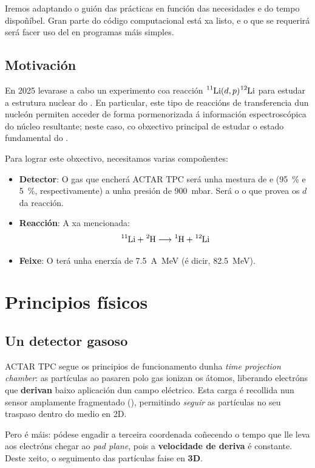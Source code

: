 \documentclass[11pt, a4paper]{article}
\newcommand{\iso}[2]{\ce{^{#1}#2}}
\begin{document}
Iremos adaptando o guión das prácticas en función das necesidades e do tempo dispoñíbel. Gran parte do código computacional está xa listo, e o que se requerirá será facer uso del en programas máis simples.

\subsection{Motivación}
En 2025 levarase a cabo un experimento coa reacción $\iso{11}{Li}(d, p)\iso{12}{Li}$ para estudar a estrutura nuclear do \iso{12}{Li}. En particular, este tipo de reaccións de transferencia dun nucleón permiten acceder de forma pormenorizada á información espectroscópica do núcleo resultante; neste caso, co obxectivo principal de estudar o estado fundamental do \iso{12}{Li}.

Para lograr este obxectivo, necesitamos varias compoñentes:
\begin{itemize}
    \item \textbf{Detector}: O gas que encherá ACTAR TPC será unha mestura de  e  (\qty{95}{\percent} e \qty{5}{\percent}, respectivamente) a unha presión de \qty{900}{\milli\bar}. Será o  o que provea os $d$ da reacción.
    \item \textbf{Reacción}: A xa mencionada:
          \begin{equation*}
              \iso{11}{Li} + \iso{2}{H} \longrightarrow \iso{1}{H} + \iso{12}{Li}
          \end{equation*}
    \item \textbf{Feixe}: O \iso{11}{Li} terá unha enerxía de \qty{7.5}{A\MeV} (é dicir, \qty{82.5}{\MeV}).
\end{itemize}

\section{Principios físicos}
\subsection{Un detector gasoso}
ACTAR TPC segue os principios de funcionamento dunha \textit{time projection chamber}: as partículas ao pasaren polo gas ionizan os átomos, liberando electróns que \textbf{derivan} baixo aplicación dun campo eléctrico. Esta carga é recollida nun sensor amplamente fragmentado (), permitindo \textit{seguir} as partículas no seu traspaso dentro do medio en 2D.

Pero é máis: pódese engadir a terceira coordenada coñecendo o tempo que lle leva aos electróns chegar ao \textit{pad plane}, pois a \textbf{velocidade de deriva} é constante. Deste xeito, o seguimento das partículas faise en \textbf{3D}.
\end{document}
